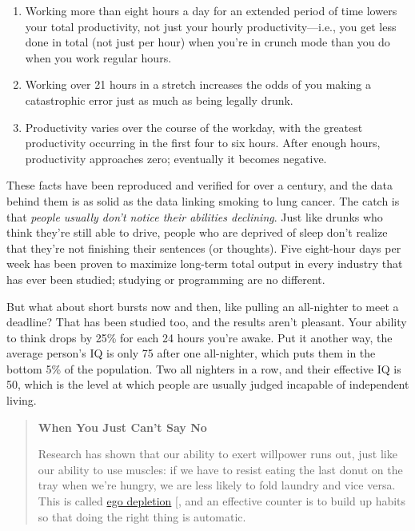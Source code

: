 \begin{enumerate}
\item
  Working more than eight hours a day for an extended period of time
  lowers your total productivity, not just your hourly
  productivity---i.e., you get less done in total (not just per hour)
  when you're in crunch mode than you do when you work regular hours.
\item
  Working over 21 hours in a stretch increases the odds of you making
  a catastrophic error just as much as being legally drunk.
\item
  Productivity varies over the course of the workday, with the
  greatest productivity occurring in the first four to six hours.
  After enough hours, productivity approaches zero; eventually it
  becomes negative.
\end{enumerate}

These facts have been reproduced and verified for over a century, and
the data behind them is as solid as the data linking smoking to lung
cancer. The catch is that \emph{people usually don't notice their abilities
declining}. Just like drunks who think they're still able to drive,
people who are deprived of sleep don't realize that they're not
finishing their sentences (or thoughts). Five eight-hour days per week
has been proven to maximize long-term total output in every industry
that has ever been studied; studying or programming are no different.

But what about short bursts now and then, like pulling an all-nighter to
meet a deadline? That has been studied too, and the results aren't
pleasant. Your ability to think drops by 25\% for each 24 hours you're
awake. Put it another way, the average person's IQ is only 75 after one
all-nighter, which puts them in the bottom 5\% of the population. Two all
nighters in a row, and their effective IQ is 50, which is the level at
which people are usually judged incapable of independent living.

\begin{quote}\setlength{\parindent}{0pt}
\textbf{When You Just Can't Say No}

Research has shown that our ability to exert willpower runs out,
just like our ability to use muscles: if we have to resist eating
the last donut on the tray when we're hungry, we are less likely to
fold laundry and vice versa. This is called \protect\hyperlink{g:ego-depletion}{ego
depletion} {[}\protect[\hyperlink{b:Mill2016a}{Mill2016a}]{]}, and an effective
counter is to build up habits so that doing the right thing is
automatic.
\end{quote}

